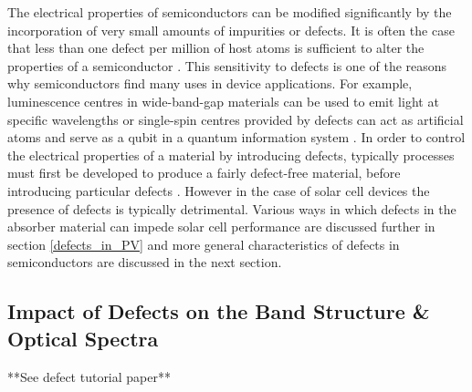 The electrical properties of semiconductors can be modified significantly by the incorporation of very small amounts of impurities or defects. It is often the case that less than one defect per million of host atoms is sufficient to alter the properties of a semiconductor \cite{fund_semi}. This sensitivity to defects is one of the reasons why semiconductors find many uses in device applications. For example, luminescence centres in wide-band-gap materials can be used to emit light at specific wavelengths or single-spin centres provided by defects can act as artificial atoms and serve as a qubit in a quantum information system \cite{defects_tutorial}. In order to control the electrical properties of a material by introducing defects, typically processes must first be developed to produce a fairly defect-free material, before introducing particular defects \cite{fund_semi}. However in the case of solar cell devices the presence of defects is typically detrimental. Various ways in which defects in the absorber material can impede solar cell performance are discussed further in section \ref{defects_in_PV} and more general characteristics of defects in semiconductors are discussed in the next section.




\subsection{Impact of Defects on the Band Structure \& Optical Spectra}\label{PL_section}
 **See defect tutorial paper**\\


